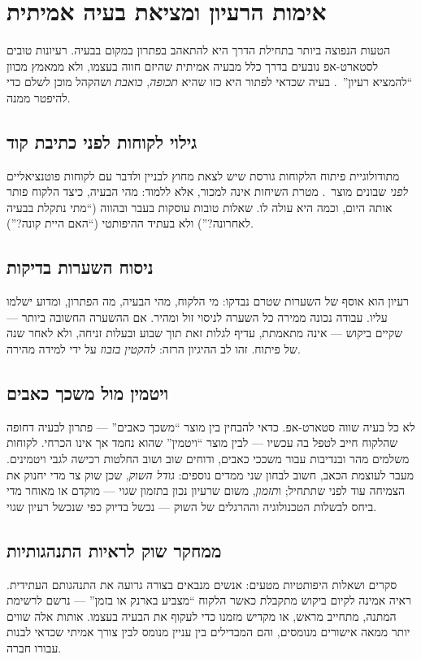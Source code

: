 \chapter{אימות הרעיון ומציאת בעיה אמיתית}

הטעות הנפוצה ביותר בתחילת הדרך היא להתאהב בפתרון במקום בבעיה. רעיונות טובים
לסטארט-אפ נובעים בדרך כלל מבעיה אמיתית שהיזם חווה בעצמו, ולא ממאמץ מכוון
``להמציא רעיון''~\cite{graham2005ideas}. בעיה שכדאי לפתור היא כזו שהיא
\emph{תכופה}, \emph{כואבת} ושהקהל מוכן לשלם כדי להיפטר ממנה.

\section{גילוי לקוחות לפני כתיבת קוד}

מתודולוגיית פיתוח הלקוחות  גורסת שיש לצאת מחוץ
לבניין ולדבר עם לקוחות פוטנציאליים \emph{לפני} שבונים מוצר~\cite{blank2013startup}.
מטרת השיחות אינה למכור, אלא ללמוד: מהי הבעיה, כיצד הלקוח פותר אותה היום, וכמה
היא עולה לו. שאלות טובות עוסקות בעבר ובהווה (``מתי נתקלת בבעיה לאחרונה?'') ולא
בעתיד ההיפותטי (``האם היית קונה?'').

\section{ניסוח השערות בדיקות}

רעיון הוא אוסף של השערות  שטרם נבדקו: מי הלקוח, מהי הבעיה,
מה הפתרון, ומדוע ישלמו עליו. עבודה נכונה ממירה כל השערה לניסוי זול ומהיר. אם
ההשערה החשובה ביותר — שקיים ביקוש — אינה מתאמתת, עדיף לגלות זאת תוך שבוע ובעלות
זניחה, ולא לאחר שנה של פיתוח. זהו לב ההיגיון הרזה: \emph{להקטין בזבוז} על ידי
למידה מהירה.

\section{ויטמין מול משכך כאבים}

לא כל בעיה שווה סטארט-אפ. כדאי להבחין בין מוצר ``משכך כאבים''
 — פתרון לבעיה דחופה שהלקוח חייב לטפל בה עכשיו — לבין מוצר
``ויטמין''  שהוא נחמד אך אינו הכרחי. לקוחות משלמים מהר ובנדיבות
עבור משככי כאבים, ודוחים שוב ושוב החלטות רכישה לגבי ויטמינים. מעבר לעוצמת הכאב,
חשוב לבחון שני ממדים נוספים: \emph{גודל השוק}, שכן שוק צר מדי יחנוק את הצמיחה
עוד לפני שתתחיל; ו\emph{תזמון}, משום שרעיון נכון בתזמון שגוי — מוקדם או מאוחר
מדי ביחס לבשלות הטכנולוגיה וההרגלים של השוק — נכשל בדיוק כפי שנכשל רעיון שגוי.

\section{ממחקר שוק לראיות התנהגותיות}

סקרים ושאלות היפותטיות מטעים: אנשים מנבאים בצורה גרועה את התנהגותם העתידית.
ראיה אמינה לקיום ביקוש מתקבלת כאשר הלקוח ``מצביע בארנק או בזמן'' — נרשם לרשימת
המתנה, מתחייב מראש, או מקדיש מזמנו כדי לעקוף את הבעיה בעצמו. אותות אלה שווים
יותר ממאה אישורים מנומסים, והם המבדילים בין עניין מנומס לבין צורך אמיתי שכדאי
לבנות עבורו חברה.
